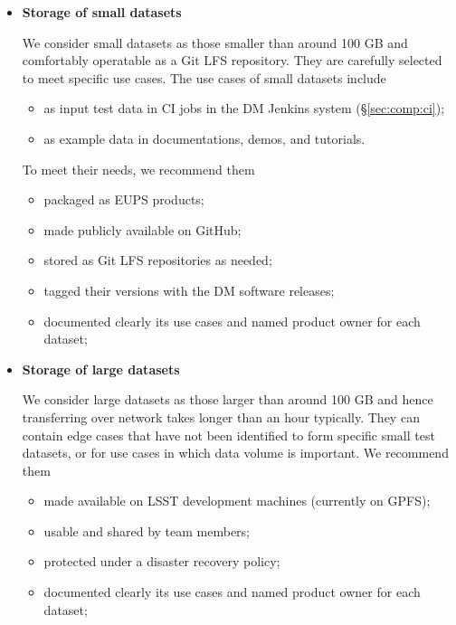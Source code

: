 \begin{itemize}
  \item \textbf{Storage of small datasets}

  We consider small datasets as those smaller than around 100 GB
  and comfortably operatable as a Git LFS repository. They are
  carefully selected to meet specific use cases. The use cases of
  small datasets include

  \begin{itemize}
    \item{as input test data in CI jobs in the DM Jenkins system
          (\S\ref{sec:comp:ci});}
    \item{as example data in documentations, demos, and tutorials.}
  \end{itemize}

  To meet their needs, we recommend them

  \begin{itemize}
    \item{packaged as EUPS products;}
    \item{made publicly available on GitHub;}
    \item{stored as Git LFS repositories as needed;}
    \item{tagged their versions with the DM software releases;}
    \item{documented clearly its use cases and named product owner for each dataset;}
  \end{itemize}

  \item \textbf{Storage of large datasets}

  We consider large datasets as those larger than around 100 GB and
  hence transferring over network takes longer than an hour typically.
  They can contain edge cases that have not been identified to form
  specific small test datasets, or for use cases in which data
  volume is important.  We recommend them

  \begin{itemize}
    \item{made available on LSST development machines (currently on GPFS);}
    \item{usable and shared by team members;}
    \item{protected under a disaster recovery policy;}
    \item{documented clearly its use cases and named product owner for each dataset;}
  \end{itemize}

\end{itemize}



